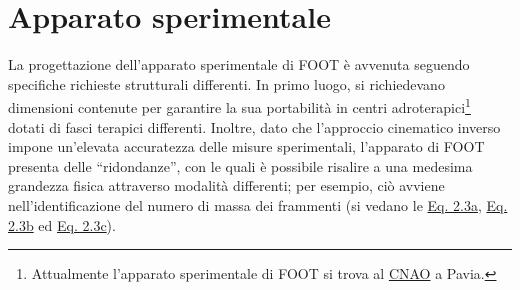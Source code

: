 \documentclass[12pt,a4paper,twoside]{report}
\begin{document}
	\section{Apparato sperimentale}\label{sec:apparato_sperimentale}
	La progettazione dell'apparato sperimentale di FOOT è avvenuta seguendo specifiche richieste strutturali differenti. In primo luogo, si richiedevano dimensioni contenute per garantire la sua portabilità in centri adroterapici\footnote{Attualmente l'apparato sperimentale di FOOT si trova al \hyperref[sec:adroterapia_italia]{CNAO} a Pavia.} dotati di fasci terapici differenti. Inoltre, dato che l'approccio cinematico inverso impone un'elevata accuratezza delle misure sperimentali, l'apparato di FOOT presenta delle ``ridondanze'', con le quali è possibile risalire a una medesima grandezza fisica attraverso modalità differenti; per esempio, ciò avviene nell'identificazione del numero di massa dei frammenti (si vedano le \hyperref[eq:a1]{Eq. 2.3a}, \hyperref[eq:a2]{Eq. 2.3b} ed \hyperref[eq:a3]{Eq. 2.3c}).
	
\end{document}
